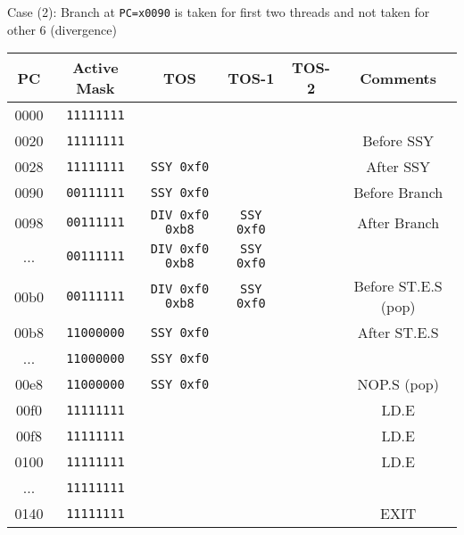 \documentclass[11pt]{article}
\begin{document}
Case (2): Branch at \verb|PC=x0090| is taken for first two threads and not taken for other 6 (divergence)
\begin{table}[H]
	\centering %
	\begin{tabular}{c c c c c c} %
		\hline\hline %
		PC   & Active Mask     & TOS                  & TOS-1           & TOS-2 & Comments            \\ [0.5ex] %
		\hline %
		0000 & \verb|11111111| &                      &                 &       &                     \\
		0020 & \verb|11111111| &                      &                 &       & Before SSY          \\
		0028 & \verb|11111111| & \verb|SSY 0xf0|      &                 &       & After SSY           \\
		0090 & \verb|00111111| & \verb|SSY 0xf0|      &                 &       & Before Branch       \\
		0098 & \verb|00111111| & \verb|DIV 0xf0 0xb8| & \verb|SSY 0xf0| &       & After Branch        \\
		...  & \verb|00111111| & \verb|DIV 0xf0 0xb8| & \verb|SSY 0xf0| &       &                     \\
		00b0 & \verb|00111111| & \verb|DIV 0xf0 0xb8| & \verb|SSY 0xf0| &       & Before ST.E.S (pop) \\
		00b8 & \verb|11000000| & \verb|SSY 0xf0|      &                 &       & After ST.E.S        \\
		...  & \verb|11000000| & \verb|SSY 0xf0|      &                 &       &                     \\
		00e8 & \verb|11000000| & \verb|SSY 0xf0|      &                 &       & NOP.S (pop)         \\
		00f0 & \verb|11111111| &                      &                 &       & LD.E                \\
		00f8 & \verb|11111111| &                      &                 &       & LD.E                \\
		0100 & \verb|11111111| &                      &                 &       & LD.E                \\
		...  & \verb|11111111| &                      &                 &       &                     \\
		0140 & \verb|11111111| &                      &                 &       & EXIT                \\
		\hline %
	\end{tabular}
	\label{table:nonlin} %
\end{table}
\newpage
\end{document}
